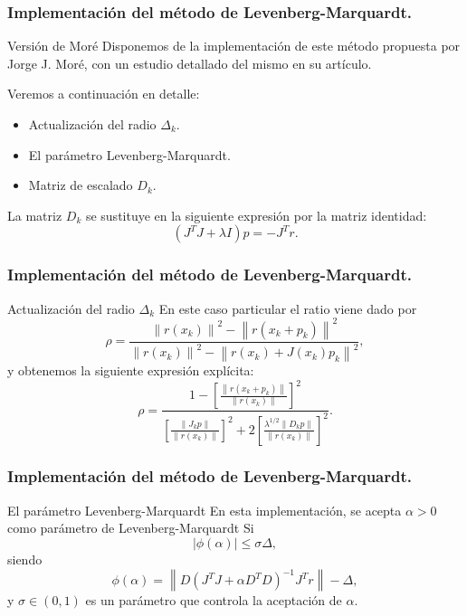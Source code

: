 \documentclass{beamer}
\newcommand{\norm}[1]{\left\lVert#1\right\rVert}
\begin{document}
\begin{frame}
    \frametitle{Implementación del método de Levenberg-Marquardt.}
    \begin{block}{Versión de Moré}
        Disponemos de la implementación de este método propuesta por Jorge J. Moré,
        con un estudio detallado del mismo en su artículo.
    \end{block} \pause
    \begin{block}{Veremos a continuación en detalle:}
        \begin{itemize}[label=\textbullet]
            \item Actualización del radio $\Delta_k$. \pause
            \item El parámetro Levenberg-Marquardt. \pause
            \item Matriz de escalado $D_k$.
        \end{itemize}
        La matriz $D_k$ se sustituye en la siguiente expresión por la matriz identidad:
        \begin{equation*}
            (J^TJ+\lambda I)p=-J^Tr.
        \end{equation*}
    \end{block}
\end{frame}

\begin{frame}
    \frametitle{Implementación del método de Levenberg-Marquardt.}
    \begin{block}{Actualización del radio $\Delta_k$}
        En este caso particular el ratio viene dado por
        \begin{equation*}
	        \rho = \frac{\norm{r(x_k)}^2-\norm{r(x_k+p_k)}^2}{\norm{r(x_k)}^2-\norm{r(x_k)+J(x_k)p_k}^2},
        \end{equation*}
        y obtenemos la siguiente expresión explícita:
        \begin{equation*}
            \rho = \frac{1-\left[\frac{\norm{r(x_k+p_k)}}{\norm{r(x_k)}}\right]^2}
                        {\left[\frac{\norm{J_kp}}{\norm{r(x_k)}}\right]^2
                        + 2\left[\frac{\lambda^{1/2}\norm{D_kp}}{\norm{r(x_k)}}\right]^2}.
        \end{equation*}
    \end{block}
\end{frame}

\begin{frame}
    \frametitle{Implementación del método de Levenberg-Marquardt.}
    \begin{block}{El parámetro Levenberg-Marquardt}
        En esta implementación, se acepta $\alpha>0$ como parámetro de Levenberg-Marquardt Si
        \begin{equation*}
            |\phi(\alpha)| \leq \sigma\Delta,
        \end{equation*}
        siendo
        \begin{equation*}
            \phi(\alpha) = \norm{D(J^TJ+\alpha D^TD)^{-1}J^Tr}-\Delta,
        \end{equation*}
        y $\sigma \in (0,1)$ es un parámetro que controla la aceptación de $\alpha$. 
    \end{block}
\end{frame}
\end{document}

